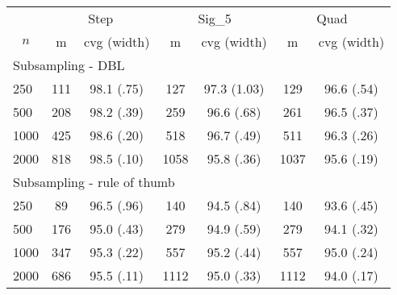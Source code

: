 \begin{tabular}{lcccccc}
   \toprule
 
           & \multicolumn{2}{c}{Step}& \multicolumn{2}{c}{Sig\_5}& \multicolumn{2}{c}{Quad} \\ 
             \cmidrule(l{2pt}r{2pt}){2-3} \cmidrule(l{2pt}r{2pt}){4-5} \cmidrule(l{2pt}r{2pt}){6-7} 
             \multicolumn{1}{c}{$n$} & \multicolumn{1}{c}{m}& \multicolumn{1}{c}{cvg (width)}& \multicolumn{1}{c}{m}& \multicolumn{1}{c}{cvg (width)}& \multicolumn{1}{c}{m}& \multicolumn{1}{c}{cvg (width)} \\  
             \hline   
 \multicolumn{7}{l}{Subsampling - DBL} \\ 
250 & 111 & 98.1 (.75) & 127 & 97.3 (1.03) & 129 & 96.6 (.54) \\ 
  500 & 208 & 98.2 (.39) & 259 & 96.6 (.68) & 261 & 96.5 (.37) \\ 
  1000 & 425 & 98.6 (.20) & 518 & 96.7 (.49) & 511 & 96.3 (.26) \\ 
  2000 & 818 & 98.5 (.10) & 1058 & 95.8 (.36) & 1037 & 95.6 (.19) \\ 
       \hline   
 \multicolumn{7}{l}{Subsampling - rule of thumb} \\ 
250 & 89 & 96.5 (.96) & 140 & 94.5 (.84) & 140 & 93.6 (.45) \\ 
  500 & 176 & 95.0 (.43) & 279 & 94.9 (.59) & 279 & 94.1 (.32) \\ 
  1000 & 347 & 95.3 (.22) & 557 & 95.2 (.44) & 557 & 95.0 (.24) \\ 
  2000 & 686 & 95.5 (.11) & 1112 & 95.0 (.33) & 1112 & 94.0 (.17) \\ 
   \hline
\end{tabular}
